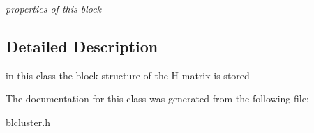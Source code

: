 \begin{DoxyCompactItemize}
\begin{DoxyCompactList}\small\item\em properties of this block \end{DoxyCompactList}\end{DoxyCompactItemize}


\subsection{\-Detailed \-Description}
in this class the block structure of the \-H-\/matrix is stored 

\-The documentation for this class was generated from the following file\-:\begin{DoxyCompactItemize}
\item 
\hyperlink{blcluster_8h}{blcluster.\-h}\end{DoxyCompactItemize}
